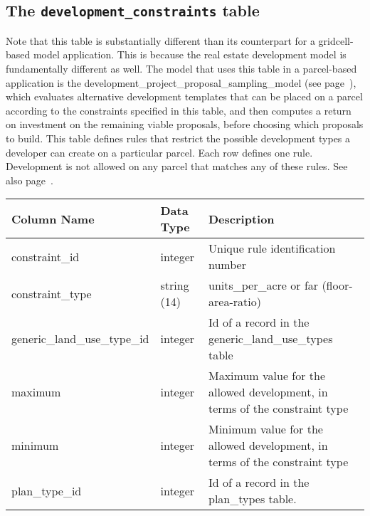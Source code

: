 \subsection{The {\tt development_constraints} table}
%
Note that this table is substantially different than its counterpart for a gridcell-based
model application.  This is because the real estate development model is fundamentally
different as well.  The model that uses this table in a parcel-based application is the 
development\_project\_proposal\_sampling\_model (see page~\pageref{sec:model-system-development-project-proposal-sampling-model}), 
which evaluates alternative 
development templates that can be placed on a parcel according to the constraints
specified in this table, and then computes a return on investment on the remaining
viable proposals, before choosing which proposals to build.
This table defines rules that restrict the possible development types a
developer can create on a particular parcel.  Each row defines one rule.
Development is not allowed on any parcel that matches any of these rules. See also page~\pageref{sec-development-constraints}.

\begin{tabular}{llp{3.5in}}

\textbf{Column Name} & \textbf{Data Type} & \textbf{Description} \\

\hline constraint_id & integer & Unique rule identification number  \\

\hline constraint\_type & string (14) &  units\_per\_acre or far (floor-area-ratio) \\

\hline generic\_land\_use\_type\_id & integer & Id of a record in the generic\_land\_use\_types table \\

\hline maximum & integer & Maximum value for the allowed development, in terms of the constraint type \\

\hline minimum & integer & Minimum value for the allowed development, in terms of the constraint type \\

\hline plan_type_id & integer & Id of a record in the plan_types table. \\

\hline
\end{tabular}

